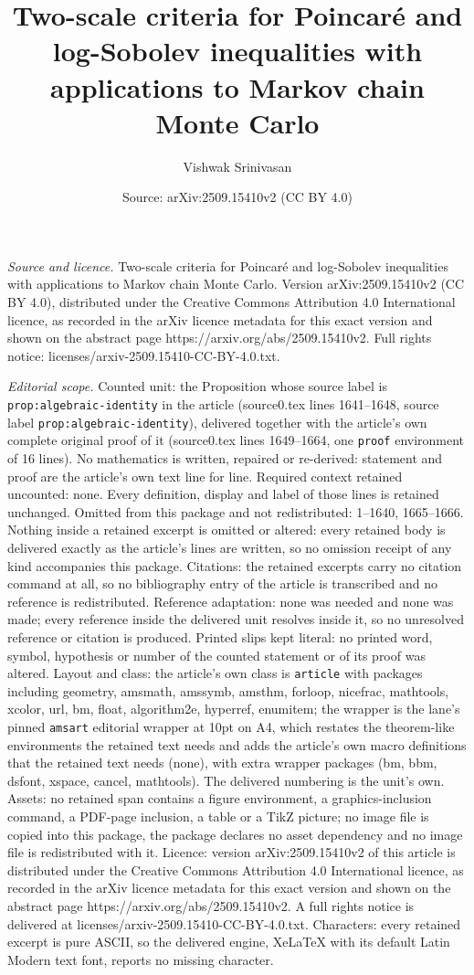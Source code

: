 \documentclass[10pt,a4paper]{amsart}
\title[Two-scale criteria for Poincar\'{e} and log-Sobolev inequali]{Two-scale criteria for Poincar\'{e} and log-Sobolev inequalities with applications to Markov chain Monte Carlo}
\author{Vishwak Srinivasan}
\date{Source: arXiv:2509.15410v2 (CC BY 4.0)}
\begin{document}
\maketitle

\noindent\emph{Source and licence.} Two-scale criteria for Poincar\'{e} and log-Sobolev inequalities with applications to Markov chain Monte Carlo. Version arXiv:2509.15410v2 (CC BY 4.0), distributed under the Creative Commons Attribution 4.0 International licence, as recorded in the arXiv licence metadata for this exact version and shown on the abstract page https://arxiv.org/abs/2509.15410v2. Full rights notice: licenses/arxiv-2509.15410-CC-BY-4.0.txt.\par\smallskip

\noindent\textit{Editorial scope.} Counted unit: the Proposition whose source label is \texttt{prop:algebraic-identity} in the article (source0.tex lines 1641--1648, source label \texttt{prop:algebraic-identity}), delivered together with the article's own complete original proof of it (source0.tex lines 1649--1664, one \texttt{proof} environment of 16 lines). No mathematics is written, repaired or re-derived: statement and proof are the article's own text line for line. Required context retained uncounted: none. Every definition, display and label of those lines is retained unchanged. Omitted from this package and not redistributed: 1--1640, 1665--1666. Nothing inside a retained excerpt is omitted or altered: every retained body is delivered exactly as the article's lines are written, so no omission receipt of any kind accompanies this package. Citations: the retained excerpts carry no citation command at all, so no bibliography entry of the article is transcribed and no reference is redistributed. Reference adaptation: none was needed and none was made; every reference inside the delivered unit resolves inside it, so no unresolved reference or citation is produced. Printed slips kept literal: no printed word, symbol, hypothesis or number of the counted statement or of its proof was altered. Layout and class: the article's own class is \texttt{article} with packages including geometry, amsmath, amssymb, amsthm, forloop, nicefrac, mathtools, xcolor, url, bm, float, algorithm2e, hyperref, enumitem; the wrapper is the lane's pinned \texttt{amsart} editorial wrapper at 10pt on A4, which restates the theorem-like environments the retained text needs and adds the article's own macro definitions that the retained text needs (none), with extra wrapper packages (bm, bbm, dsfont, xspace, cancel, mathtools). The delivered numbering is the unit's own. Assets: no retained span contains a figure environment, a graphics-inclusion command, a PDF-page inclusion, a table or a TikZ picture; no image file is copied into this package, the package declares no asset dependency and no image file is redistributed with it. Licence: version arXiv:2509.15410v2 of this article is distributed under the Creative Commons Attribution 4.0 International licence, as recorded in the arXiv licence metadata for this exact version and shown on the abstract page https://arxiv.org/abs/2509.15410v2. A full rights notice is delivered at licenses/arxiv-2509.15410-CC-BY-4.0.txt. Characters: every retained excerpt is pure ASCII, so the delivered engine, XeLaTeX with its default Latin Modern text font, reports no missing character.
\end{document}

